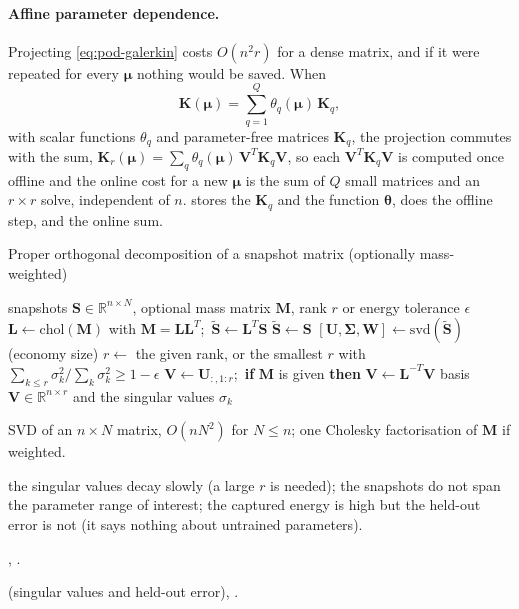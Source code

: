 \paragraph{Affine parameter dependence.}
Projecting \eqref{eq:pod-galerkin} costs $O(n^2r)$ for a dense matrix, and if it were repeated for every $\bm\mu$ nothing would be saved. When
\begin{equation}\label{eq:pod-affine}
\bm K(\bm\mu)=\sum_{q=1}^{Q}\theta_q(\bm\mu)\,\bm K_q,
\end{equation}
with scalar functions $\theta_q$ and parameter-free matrices $\bm K_q$, the projection commutes with the sum, $\bm K_r(\bm\mu)=\sum_q\theta_q(\bm\mu)\,\bm V^T\bm K_q\bm V$, so each $\bm V^T\bm K_q\bm V$ is computed once offline and the online cost for a new $\bm\mu$ is the sum of $Q$ small matrices and an $r\times r$ solve, independent of $n$.  stores the $\bm K_q$ and the function $\bm\theta$,  does the offline step, and  the online sum.

\begin{algbox}{Proper orthogonal decomposition of a snapshot matrix (optionally mass-weighted)}
\begin{pseudo}
\Require snapshots $\bm S\in\mathbb R^{n\times N}$, optional mass matrix $\bm M$, rank $r$ or energy tolerance $\epsilon$
  \State $\bm L\gets\mathrm{chol}(\bm M)$ with $\bm M=\bm L\bm L^T$;\ $\tilde{\bm S}\gets\bm L^T\bm S$
\Else
  \State $\tilde{\bm S}\gets\bm S$
\EndIf
\State $[\bm U,\bm\Sigma,\bm W]\gets\mathrm{svd}(\tilde{\bm S})$ (economy size)
\State $r\gets$ the given rank, or the smallest $r$ with $\sum_{k\le r}\sigma_k^2/\sum_k\sigma_k^2\ge1-\epsilon$
\State $\bm V\gets\bm U_{:,1:r}$;\ \textbf{if} $\bm M$ is given \textbf{then} $\bm V\gets\bm L^{-T}\bm V$ 
\Ensure basis $\bm V\in\mathbb R^{n\times r}$ and the singular values $\sigma_k$
\end{pseudo}
\begin{algdet}
\item[Cost] SVD of an $n\times N$ matrix, $O(nN^2)$ for $N\le n$; one Cholesky factorisation of $\bm M$ if weighted.
\item[Fails when] the singular values decay slowly (a large $r$ is needed); the snapshots do not span the parameter range of interest; the captured energy is high but the held-out error is not (it says nothing about untrained parameters).
\item[Code] , .
\item[Verified in]  (singular values and held-out error), .
\end{algdet}
\end{algbox}


